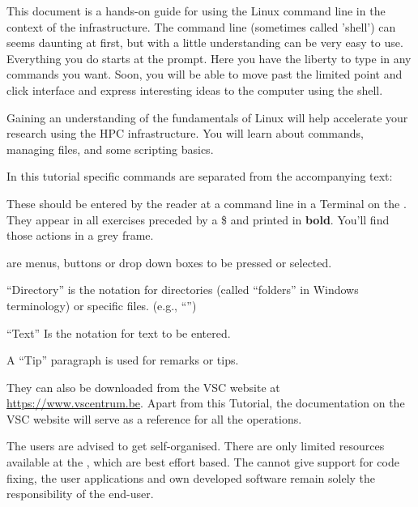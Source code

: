 This document is a hands-on guide for using the \gls{Linux} command line in the
context of the \strong{\university} \hpc infrastructure. The
command line (sometimes called 'shell') can seems daunting at first, but with a
little understanding can be very easy to use. Everything you do starts at the
prompt. Here you have the liberty to type in any commands you want. Soon, you
will be able to move past the limited point and click interface and express
interesting ideas to the computer using the shell.

Gaining an understanding of the fundamentals of Linux will help accelerate your
research using the HPC infrastructure.  You will learn about commands, managing
files, and some scripting basics.


In this tutorial specific commands are separated from the accompanying text:
\begin{prompt}
\end{prompt}

These should be entered by the reader at a command line in a Terminal on the \hpcInfra. They appear in all exercises preceded by a \$ and printed in \textbf{bold}. You'll find those actions in a grey frame.

 are menus, buttons or drop down boxes to be pressed or selected.

``Directory'' is the notation for directories (called ``folders'' in
Windows terminology) or specific files. (e.g., ``\homedir'')

``Text'' Is the notation for text to be entered.

\begin{tip}
A ``Tip'' paragraph is used for remarks or tips.
\end{tip}

They can also be downloaded from the VSC website at
\url{https://www.vscentrum.be}.
Apart from this \hpc Tutorial, the documentation on the VSC website
will serve as a reference for all the
operations.


\begin{tip}
The users are advised to get self-organised. There are
only limited resources available at the \hpc, which are best effort based.
The \hpc cannot give support for code fixing, the user applications and own
developed software remain solely the responsibility of the end-user.
\end{tip}

